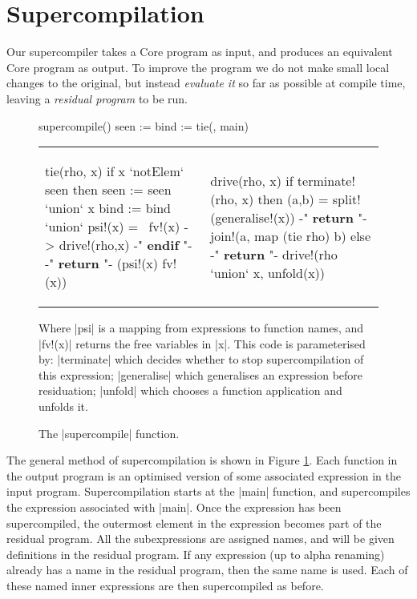 \section{Supercompilation}
\label{sec:optimisation}

Our supercompiler takes a Core program as input, and produces an equivalent Core program as output. To improve the program we do not make small local changes to the original, but instead \textit{evaluate it} so far as possible at compile time, leaving a \textit{residual program} to be run.

\begin{figure}
\begin{code}
supercompile()
    seen := {}
    bind := {}
    tie({}, main)
\end{code}

\vspace{-6mm}

\begin{tabular}{p{6.9cm}p{5cm}}
\begin{code}
tie(rho, x)
    if x `notElem` seen then
        seen := seen `union` {x}
        bind := bind `union` {psi\!!(x) = \ fv\!!(x) -> drive\!!(rho,x)}
    {-" \textsf{\textbf{endif}} "-}
    {-" \textsf{\textbf{return }} "-} (psi\!!(x) fv\!!(x))
\end{code}
&
\begin{code}
drive(rho, x)
    if terminate\!!(rho, x) then
        (a,b) = split\!!(generalise\!!(x))
        {-" \textsf{\textbf{return }} "-} join\!!(a, map (tie rho) b)
    else
        {-" \textsf{\textbf{return }} "-} drive\!!(rho `union` {x}, unfold(x))
\end{code}
\end{tabular}

\vspace{-3mm}

Where |psi| is a mapping from expressions to function names, and |fv\!!(x)| returns the free variables in |x|. This code is parameterised by: |terminate| which decides whether to stop supercompilation of this expression; |generalise| which generalises an expression before residuation; |unfold| which chooses a function application and unfolds it.
\vspace{3mm}
\caption{The |supercompile| function.}
\label{fig:supercompile}
\end{figure}

The general method of supercompilation is shown in Figure \ref{fig:supercompile}. Each function in the output program is an optimised version of some associated expression in the input program. Supercompilation starts at the |main| function, and supercompiles the expression associated with |main|. Once the expression has been supercompiled, the outermost element in the expression becomes part of the residual program. All the subexpressions are assigned names, and will be given definitions in the residual program. If any expression (up to alpha renaming) already has a name in the residual program, then the same name is used. Each of these named inner expressions are then supercompiled as before.

